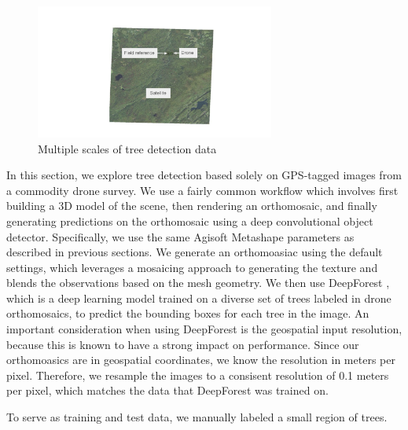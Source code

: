 \begin{figure}
    \centering
    \includegraphics[width=0.7\textwidth, trim={6cm 0cm 5cm 1cm},clip]{figs/methods/tree_detection/multi_scale_data.pdf}
    \caption{Multiple scales of tree detection data}
    \label{fig:enter-label}
\end{figure}

In this section, we explore tree detection based solely on GPS-tagged images from a commodity drone survey. We use a fairly common workflow which involves first building a 3D model of the scene, then rendering an orthomosaic, and finally generating predictions on the orthomosaic using a deep convolutional object detector. Specifically, we use the same Agisoft Metashape parameters as described in previous sections. We generate an orthomoasiac using the default settings, which leverages a mosaicing approach to generating the texture and blends the observations based on the mesh geometry. We then use DeepForest \cite{Weinstein2020DeepForest:Delineation}, which is a deep learning model trained on a diverse set of trees labeled in drone orthomosaics, to predict the bounding boxes for each tree in the image. An important consideration when using DeepForest is the geospatial input resolution, because this is known to have a strong impact on performance. Since our orthomoasics are in geospatial coordinates, we know the resolution in meters per pixel. Therefore, we resample the images to a consisent resolution of 0.1 meters per pixel, which matches the data that DeepForest was trained on.

To serve as training and test data, we manually labeled a small region of trees. 

